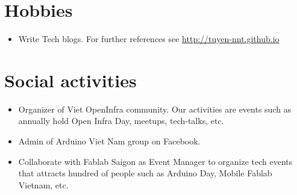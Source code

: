 \documentclass[letterpaper,11pt]{article}
\newcommand{\resumeItemNornal}[1]{
  \item\small{
    {#1 \vspace{-2pt}}
  }
}
\newcommand{\resumeSubItemNormal}[1]{\resumeItemNornal{#1}\vspace{-4pt}}
\newcommand{\resumeSubHeadingListStart}{\begin{itemize}[leftmargin=*]}
\newcommand{\resumeSubHeadingListEnd}{\end{itemize}}
\begin{document}
 \section{Hobbies}
  \resumeSubHeadingListStart
    \resumeSubItemNormal
      {Write Tech blogs. For further references see \url{http://tuyen-nnt.github.io}}
\resumeSubHeadingListEnd

\section{Social activities}
  \resumeSubHeadingListStart
    \resumeSubItemNormal
      {Organizer of Viet OpenInfra community. Our activities are events such as annually hold Open Infra Day, meetups, tech-talks, etc.}
    \resumeSubItemNormal
      {Admin of Arduino Viet Nam group on Facebook.}
    \resumeSubItemNormal
      {Collaborate with Fablab Saigon as Event Manager to organize tech events that attracts hundred of people such as Arduino Day, Mobile Fablab Vietnam, etc.}
\resumeSubHeadingListEnd



\end{document}
